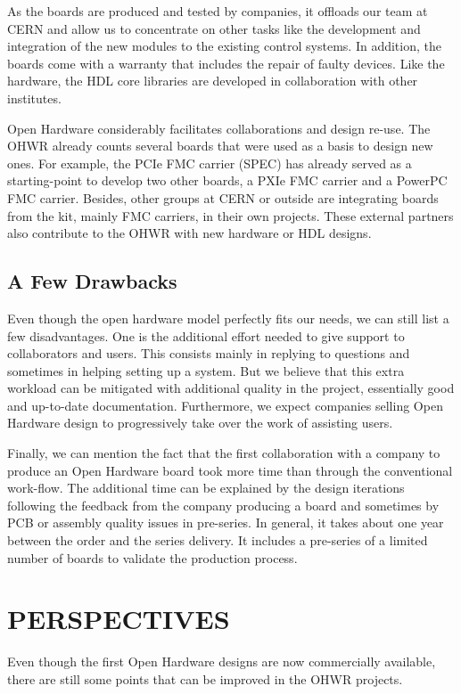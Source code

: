 \documentclass{JAC2003}
\begin{document}
As the boards are produced and tested by companies, it offloads our team at CERN and allow us to concentrate on other tasks like the development and integration of the new modules to the existing control systems.
In addition, the boards come with a warranty that includes the repair of faulty devices.
Like the hardware, the HDL core libraries are developed in collaboration with other institutes.

Open Hardware considerably facilitates collaborations and design re-use.
The OHWR already counts several boards that were used as a basis to design new ones.
For example, the PCIe FMC carrier (SPEC) has already served as a starting-point to develop two other boards, a PXIe FMC carrier and a PowerPC FMC carrier.
Besides, other groups at CERN or outside are integrating boards from the kit, mainly FMC carriers, in their own projects.
These external partners also contribute to the OHWR with new hardware or HDL designs.

\subsection{A Few Drawbacks}
Even though the open hardware model perfectly fits our needs, we can still list a few disadvantages.
One is the additional effort needed to give support to collaborators and users.
This consists mainly in replying to questions and sometimes in helping setting up a system.
But we believe that this extra workload can be mitigated with additional quality in the project, essentially good and up-to-date documentation.
Furthermore, we expect companies selling Open Hardware design to progressively take over the work of assisting users.

Finally, we can mention the fact that the first collaboration with a company to produce an Open Hardware board took more time than through the conventional work-flow.
The additional time can be explained by the design iterations following the feedback from the company producing a board and sometimes by PCB or assembly quality issues in pre-series.
In general, it takes about one year between the order and the series delivery.
It includes a pre-series of a limited number of boards to validate the production process.


\section{PERSPECTIVES}
Even though the first Open Hardware designs are now commercially available, there are still some points that can be improved in the OHWR projects.
\end{document}
